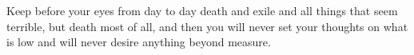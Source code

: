 Keep before your eyes from day to day  death and exile and all things that seem
terrible, but death most  of all, and then you will never  set your thoughts on
what is low and will never desire anything beyond measure.

